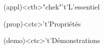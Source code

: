 \documentclass[../../main/main.tex]{subfiles}
\begin{document}
%
%
\begin{tcn}[sidebyside, fontupper=\small, fontlower=\small](appl)<ctb>"chek"'t'{L'essentiel}
	\begin{tcn}(prop)<ctc>'t'{Propriétés}
	\end{tcn}
	\begin{tcn}(demo)<ctc>'t'{Démonstrations}

\end{tcn}
\end{tcn}
\end{document}
